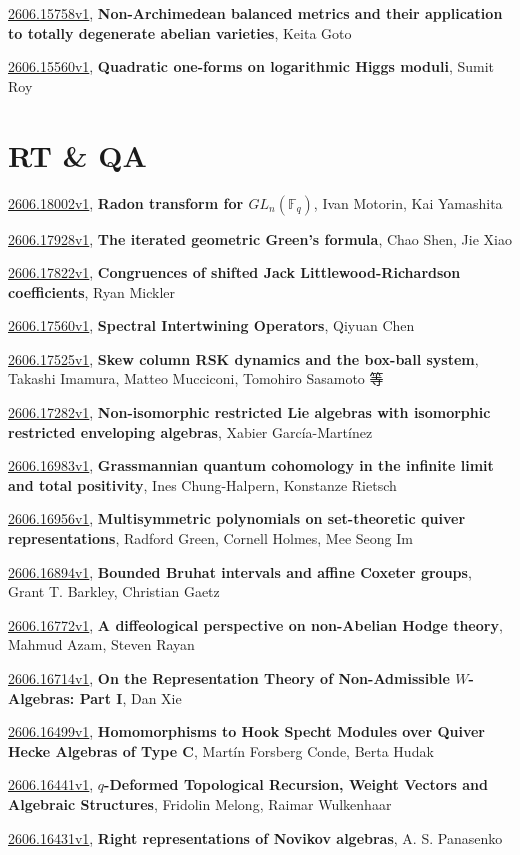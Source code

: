 \documentclass[9pt, a4paper]{article}
\theoremstyle{plain}
\theoremstyle{definition}
\theoremstyle{remark}
\newcommand{\arxiv}[3]{\href{https://arxiv.org/abs/#1}{#1}, \textbf{\textcolor{arxivblue}{#2}}, #3}
\begin{document}
\arxiv{2606.15758v1}{Non-Archimedean balanced metrics and their application to totally degenerate abelian varieties}{Keita Goto}

\arxiv{2606.15560v1}{Quadratic one-forms on logarithmic Higgs moduli}{Sumit Roy}


\section{RT \& QA}
\arxiv{2606.18002v1}{Radon transform for $GL_n(\mathbb{F}_q)$}{Ivan Motorin, Kai Yamashita}

\arxiv{2606.17928v1}{The iterated geometric Green's formula}{Chao Shen, Jie Xiao}

\arxiv{2606.17822v1}{Congruences of shifted Jack Littlewood-Richardson coefficients}{Ryan Mickler}

\arxiv{2606.17560v1}{Spectral Intertwining Operators}{Qiyuan Chen}

\arxiv{2606.17525v1}{Skew column RSK dynamics and the box-ball system}{Takashi Imamura, Matteo Mucciconi, Tomohiro Sasamoto 等}

\arxiv{2606.17282v1}{Non-isomorphic restricted Lie algebras with isomorphic restricted enveloping algebras}{Xabier García-Martínez}

\arxiv{2606.16983v1}{Grassmannian quantum cohomology in the infinite limit and total positivity}{Ines Chung-Halpern, Konstanze Rietsch}

\arxiv{2606.16956v1}{Multisymmetric polynomials on set-theoretic quiver representations}{Radford Green, Cornell Holmes, Mee Seong Im}

\arxiv{2606.16894v1}{Bounded Bruhat intervals and affine Coxeter groups}{Grant T. Barkley, Christian Gaetz}

\arxiv{2606.16772v1}{A diffeological perspective on non-Abelian Hodge theory}{Mahmud Azam, Steven Rayan}

\arxiv{2606.16714v1}{On the Representation Theory of Non-Admissible $W$-Algebras: Part I}{Dan Xie}

\arxiv{2606.16499v1}{Homomorphisms to Hook Specht Modules over Quiver Hecke Algebras of Type C}{Martín Forsberg Conde, Berta Hudak}

\arxiv{2606.16441v1}{$q$-Deformed Topological Recursion, Weight Vectors and Algebraic Structures}{Fridolin Melong, Raimar Wulkenhaar}

\arxiv{2606.16431v1}{Right representations of Novikov algebras}{A. S. Panasenko}
\end{document}
